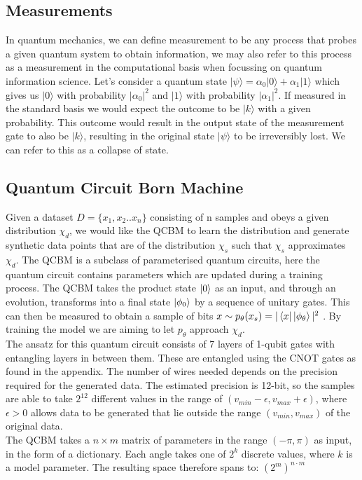 \documentclass[12pt]{article}
\numberwithin{equation}{section}
\begin{document}
\subsection{Measurements}
In quantum mechanics, we can define measurement to be any process that probes a 
given quantum system to obtain information, we may also refer to this process as 
a measurement in the computational basis when focussing on quantum information 
science. Let's consider a quantum state 
$|\psi \rangle = \alpha_0|0\rangle+\alpha_1|1\rangle$ which gives us $|0\rangle$
with probability $|\alpha_0|^2$ and $|1\rangle$ with probability $|\alpha_1|^2$. 
If measured in the standard basis we would expect the outcome to be $|k\rangle$
with a given probability. This outcome would result in the output 
state of the measurement gate to also be $|k\rangle$, resulting in the original 
state $|\psi\rangle$ to be irreversibly lost. We can refer to this as a collapse of state. 


\subsection{Quantum Circuit Born Machine}
Given a dataset $D = \{x_1, x_2.. x_n\}$ consisting of n samples and obeys a 
given distribution $\chi_d$, we would like the QCBM to learn the distribution 
and generate synthetic data points that are of the distribution $\chi_s$ such that
$\chi_s$ approximates $\chi_d$.
The QCBM is a subclass of parameterised quantum circuits, 
here the quantum circuit contains parameters which are updated during a training 
process. The QCBM takes the product state $\ket{0}$ as an input, and through an 
evolution, transforms into a final state $\ket{\phi_0}$ by a sequence of unitary 
gates. This can then be measured to obtain a sample of bits 
$x \sim p_\theta (x_s)=|\bra{x}\ket{\phi_\theta}|^2$ . By training the model we 
are aiming to let $p_\theta$ approach $\chi_d$. 
\\
The ansatz for this quantum circuit consists of 7 layers
of 1-qubit gates with entangling layers in between them. These are 
entangled using the CNOT gates as found in the appendix. The number of wires 
needed depends on the precision required for the generated data. The estimated
precision is 12-bit, so the samples are able to take $2^{12}$ different values in 
the range of $ (v_{min} - \epsilon, v_{max} + \epsilon )$, where $\epsilon > 0 $
allows data to be generated that lie outside the range $(v_{min},v_{max})$ of the 
original data.
\\
The QCBM takes a $n \times m$ matrix of parameters in the range $(-\pi, \pi)$ as 
input, in the form of a dictionary. Each angle takes one of $2^k$ discrete values, 
where $k$ is a model parameter. The resulting space therefore spans to: 
$(2^m)^{n\cdot m}$
\clearpage
\end{document}
